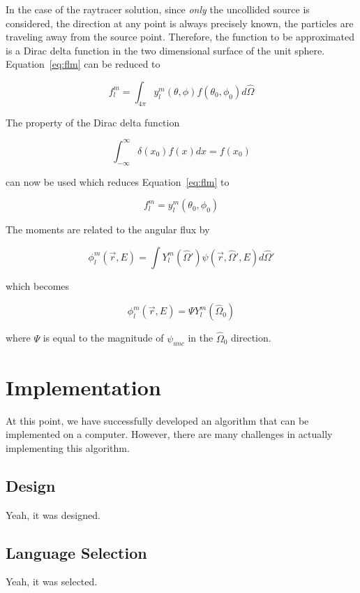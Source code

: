 \documentclass{article}
\numberwithin{equation}{subsection}
\begin{document}
In the case of the raytracer solution, since \textit{only} the uncollided source is considered, the direction at any point is always precisely known, the particles are traveling away from the source point. Therefore, the function to be approximated is a Dirac delta function in the two dimensional surface of the unit sphere. Equation~\ref{eq:flm} can be reduced to

\begin{equation}
f_l^m = \int_{4 \pi} y_l^m(\theta, \phi)f(\theta_0, \phi_0) d\hat{\Omega}
\end{equation}

The property of the Dirac delta function 

\begin{equation}
\int_{-\infty}^{\infty} \delta(x_0) f(x) dx = f(x_0)
\end{equation}

can now be used which reduces Equation~\ref{eq:flm} to

\begin{equation}
f_l^m = y_l^m(\theta_0, \phi_0)
\end{equation}

The moments are related to the angular flux by

\begin{equation}
\phi_l^m(\vec{r}, E) = \int Y_l^m(\hat{\Omega} ') \psi(\vec{r}, \hat{\Omega}', E) d\hat{\Omega}'
\end{equation}

which becomes

\begin{equation}
\phi_l^m(\vec{r}, E) = \Psi Y_l^m(\hat{\Omega}_0)
\end{equation}

where $\Psi$ is equal to the magnitude of $\psi_{unc}$ in the $\hat{\Omega}_0$ direction.

\section{Implementation}
At this point, we have successfully developed an algorithm that can be implemented on a computer. However, there are many challenges in actually implementing this algorithm.

\subsection{Design}
Yeah, it was designed.

\subsection{Language Selection}
Yeah, it was selected.
\end{document}
